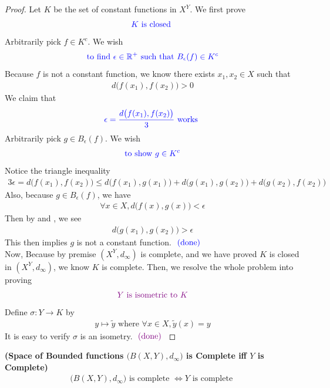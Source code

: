 \documentclass{report}
\begin{document}
\begin{proof}
Let $K$ be the set of constant functions  in $X^Y$. We first prove 
 \begin{align*}
\textcolor{blue}{K\text{ is closed }}
\end{align*}
Arbitrarily pick $f \in K^c$. We wish 
\begin{align*}
\textcolor{blue}{\text{ to find $\epsilon \in\mathbb{R}^+$ such that $B_{\epsilon }(f) \in K^c$ }}
\end{align*}
Because $f$ is not a constant function, we know there exists $x_1,x_2 \in X$ such that 
\begin{align*}
d\big(f(x_1),f(x_2) \big)>0
\end{align*}
We claim that 
\begin{align*}
\textcolor{blue}{\epsilon=\frac{d\big(f(x_1),f(x_2) \big)}{3}\text{ works }}
\end{align*}
Arbitrarily pick $g \in B_\epsilon(f)$. We wish 
\begin{align*}
\textcolor{blue}{\text{ to show $g\in K^c$  }}
\end{align*}
Notice the triangle inequality 
\begin{align}
\label{K7}
3\epsilon =d\big(f(x_1),f(x_2) \big)\leq d\big(f(x_1),g(x_1) \big)+d\big(g(x_1),g(x_2) \big)+d\big(g(x_2),f(x_2) \big)
\end{align}
Also, because $g\in B_\epsilon (f)$, we have
\begin{align}
  \label{K8}
\forall x\in X, d\big(f(x),g(x) \big)<\epsilon 
\end{align}
Then by  and , we see 
\begin{align*}
d\big(g(x_1),g(x_2) \big)> \epsilon 
\end{align*}
This then implies $g$ is not a constant function.  $\textcolor{blue}{\text{ (done) }}$\\

Now, Because by premise $(X^Y,d_{\infty})$ is complete, and we have proved $K$ is closed in  $(X^Y,d_\infty)$, we know $K$ is complete. Then, we resolve the whole problem into proving 
\begin{align*}
\textcolor{violet}{Y \text{ is isometric to }K}
\end{align*}
Define $\sigma:Y \to K $ by 
\begin{align*}
y \mapsto \tilde{y}\text{ where }\forall x \in X, \tilde{y}(x)=y 
\end{align*}
It is easy to verify $\sigma$ is an isometry. $\textcolor{violet}{\text{ (done) }}$
\end{proof}
\begin{corollary}
\label{SoB}
\textbf{(Space of Bounded functions $\big(B(X,Y),d_{\infty} \big)$ is Complete iff  $Y$ is Complete)} 
\begin{align*}
\big(B(X,Y),d_\infty \big)\text{ is complete }\iff  Y\text{ is complete }
\end{align*}
\end{corollary}
\end{document}

